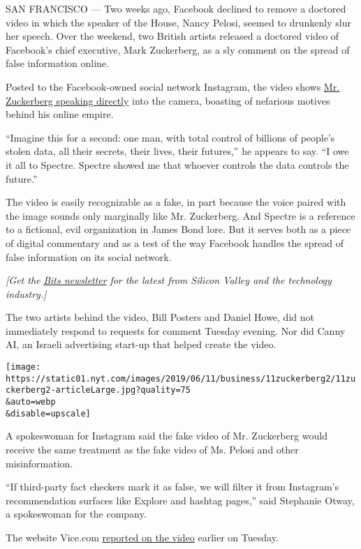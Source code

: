 SAN FRANCISCO --- Two weeks ago, Facebook declined to remove a doctored
video in which the speaker of the House, Nancy Pelosi, seemed to
drunkenly slur her speech. Over the weekend, two British artists
released a doctored video of Facebook's chief executive, Mark
Zuckerberg, as a sly comment on the spread of false information online.

Posted to the Facebook-owned social network Instagram, the video shows
\href{https://www.instagram.com/p/ByaVigGFP2U/?utm_source=ig_embed\&utm_campaign=embed_video_watch_again}{Mr.
Zuckerberg speaking directly} into the camera, boasting of nefarious
motives behind his online empire.

``Imagine this for a second: one man, with total control of billions of
people's stolen data, all their secrets, their lives, their futures,''
he appears to say. ``I owe it all to Spectre. Spectre showed me that
whoever controls the data controls the future.''

The video is easily recognizable as a fake, in part because the voice
paired with the image sounds only marginally like Mr. Zuckerberg. And
Spectre is a reference to a fictional, evil organization in James Bond
lore. But it serves both as a piece of digital commentary and as a test
of the way Facebook handles the spread of false information on its
social network.

\emph{{[}Get the}
\href{https://www.nytimes.com/newsletters/signup/TU}{\emph{Bits
newsletter}} \emph{for the latest from Silicon Valley and the technology
industry.{]}}

The two artists behind the video, Bill Posters and Daniel Howe, did not
immediately respond to requests for comment Tuesday evening. Nor did
Canny AI, an Israeli advertising start-up that helped create the video.

\texttt{[image: https://static01.nyt.com/images/2019/06/11/business/11zuckerberg2/11zuckerberg2-articleLarge.jpg?quality=75\\\&auto=webp\\\&disable=upscale]}

A spokeswoman for Instagram said the fake video of Mr. Zuckerberg would
receive the same treatment as the fake video of Ms. Pelosi and other
misinformation.

``If third-party fact checkers mark it as false, we will filter it from
Instagram's recommendation surfaces like Explore and hashtag pages,''
said Stephanie Otway, a spokeswoman for the company.

The website Vice.com
\href{https://www.vice.com/en_us/article/ywyxex/deepfake-of-mark-zuckerberg-facebook-fake-video-policy}{reported
on the video} earlier on Tuesday.

